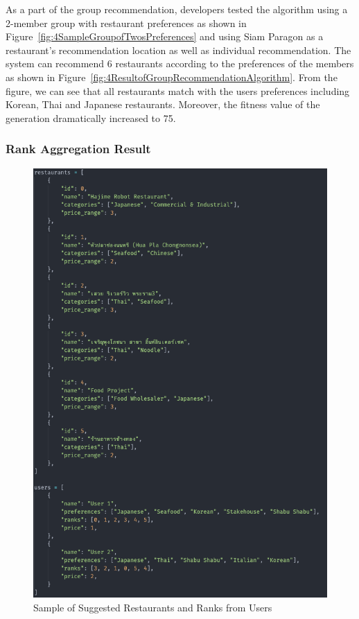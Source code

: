 \documentclass[12pt,oneside,openright,a4paper]{cpe-english-project}
\begin{document}
As a part of the group recommendation, developers tested the algorithm using a 2-member group with restaurant preferences as shown in  Figure~\ref{fig:4SampleGroupofTwosPreferences} and using Siam Paragon as a restaurant's recommendation location as well as individual recommendation. The system can recommend 6 restaurants according to the preferences of the members as shown in Figure~\ref{fig:4ResultofGroupRecommendationAlgorithm}. From the figure, we can see that all restaurants match with the users preferences including Korean, Thai and Japanese restaurants. Moreover, the fitness value of the generation dramatically increased to 75.

\subsubsection{Rank Aggregation Result}

\begin{figure}[H]\centering
\includegraphics[width=400pt]{./images/4SampleofSuggestedRestaurantsandRanksfromUsers.png}
\caption{Sample of Suggested Restaurants and Ranks from Users}\label{fig:4SampleofSuggestedRestaurantsandRanksfromUsers}
\end{figure}
\end{document}
